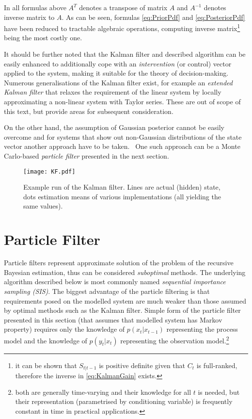 In all formulas above \(A^T\) denotes a transpose of matrix \(A\) and \(A^{-1}\) denotes inverse
matrix to \(A\). As can be seen, formulas \eqref{eq:PriorPdf} and \eqref{eq:PosteriorPdf} have
been reduced to tractable algebraic operations, computing inverse matrix\footnote{it can be shown
that \(S_{t|t-1}\) is positive definite given that \(C_t\) is full-ranked,
therefore the inverse in \eqref{eq:KalmanGain} exists.} being the most costly one.

It should be further noted that the Kalman filter and described algorithm can be easily enhanced to
additionally cope with an \emph{intervention} (or control) vector applied to the system, making it
suitable for the theory of decision-making. Numerous generalisations of the Kalman filter exist, for
example an \emph{extended Kalman filter} that relaxes the requirement of the linear system by locally
approximating a non-linear system with Taylor series. These are out of scope of this
text, but provide areas for subsequent consideration.

On the other hand, the assumption of Gaussian posterior {\pdf} cannot be easily overcome and for
systems that show out non-Gaussian distributions of the state vector another approach have to be
taken.~\cite{AruMasGor:02} One such approach can be a Monte Carlo-based \emph{particle filter}
presented in the next section.

\begin{figure}[h]
	\centering
	\texttt{[image: KF.pdf]}
	\caption[Example run of the Kalman filter]{Example run of the Kalman filter. Lines are actual
	(hidden) state, dots estimation means of various implementations (all yielding the same values).}
	\label{fig:KF}
\end{figure}

\section{Particle Filter} \label{sec:ParticleFilter}

Particle filters represent approximate solution of the problem of the recursive Bayesian estimation,
thus can be considered \emph{suboptimal} methods. The underlying algorithm described below is most
commonly named \emph{sequential importance sampling (SIS)}. The biggest advantage of the particle filtering
is that requirements posed on the modelled system are much weaker than those assumed by optimal methods
such as the Kalman filter. Simple form of the particle filter presented in this section (that assumes that
modelled system has Markov property) requires only the knowledge of {\pdf} \(p(x_t|x_{t-1})\)
representing the process model and the knowledge of \(p(y_t|x_t)\) representing the observation
model.\footnote{both {\pdfs} are generally time-varying and their knowledge for all \(t\) is needed,
but their representation (parametrised by conditioning variable) is frequently constant in time in
practical applications.}

